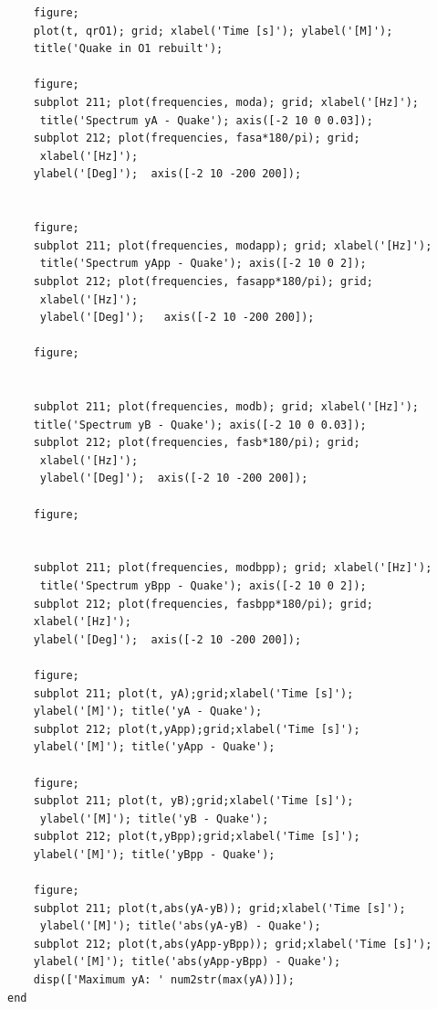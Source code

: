 \documentclass[10pt,a4paper,final]{report}
\begin{document}
\begin{lstlisting}
    figure;
    plot(t, qrO1); grid; xlabel('Time [s]'); ylabel('[M]'); 
    title('Quake in O1 rebuilt');

    figure;
    subplot 211; plot(frequencies, moda); grid; xlabel('[Hz]');
     title('Spectrum yA - Quake'); axis([-2 10 0 0.03]);
    subplot 212; plot(frequencies, fasa*180/pi); grid;
     xlabel('[Hz]'); 
    ylabel('[Deg]');  axis([-2 10 -200 200]);


    figure;
    subplot 211; plot(frequencies, modapp); grid; xlabel('[Hz]');
     title('Spectrum yApp - Quake'); axis([-2 10 0 2]);
    subplot 212; plot(frequencies, fasapp*180/pi); grid;
     xlabel('[Hz]');
     ylabel('[Deg]');   axis([-2 10 -200 200]);

    figure;


    subplot 211; plot(frequencies, modb); grid; xlabel('[Hz]'); 
    title('Spectrum yB - Quake'); axis([-2 10 0 0.03]);
    subplot 212; plot(frequencies, fasb*180/pi); grid;
     xlabel('[Hz]');
     ylabel('[Deg]');  axis([-2 10 -200 200]);

    figure;


    subplot 211; plot(frequencies, modbpp); grid; xlabel('[Hz]');
     title('Spectrum yBpp - Quake'); axis([-2 10 0 2]);
    subplot 212; plot(frequencies, fasbpp*180/pi); grid;
    xlabel('[Hz]'); 
    ylabel('[Deg]');  axis([-2 10 -200 200]);

    figure;
    subplot 211; plot(t, yA);grid;xlabel('Time [s]'); 
    ylabel('[M]'); title('yA - Quake');
    subplot 212; plot(t,yApp);grid;xlabel('Time [s]'); 
    ylabel('[M]'); title('yApp - Quake');

    figure;
    subplot 211; plot(t, yB);grid;xlabel('Time [s]');
     ylabel('[M]'); title('yB - Quake');
    subplot 212; plot(t,yBpp);grid;xlabel('Time [s]'); 
    ylabel('[M]'); title('yBpp - Quake');

    figure;
    subplot 211; plot(t,abs(yA-yB)); grid;xlabel('Time [s]');
     ylabel('[M]'); title('abs(yA-yB) - Quake');
    subplot 212; plot(t,abs(yApp-yBpp)); grid;xlabel('Time [s]'); 
    ylabel('[M]'); title('abs(yApp-yBpp) - Quake');
    disp(['Maximum yA: ' num2str(max(yA))]);
end
\end{lstlisting}
\newpage
\end{document}
